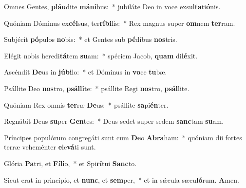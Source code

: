 \item Omnes Gentes, \textbf{pláu}dite \textbf{má}\textbf{ni}bus:~* jubiláte Deo in voce exsul\textbf{ta}ti\textbf{ó}nis.
\item Quóniam Dóminus ex\textbf{cél}sus, ter\textbf{rí}\textbf{bi}lis:~* Rex magnus super \textbf{om}nem \textbf{ter}ram.
\item Subjécit \textbf{pó}pulos \textbf{no}bis:~* et Gentes sub \textbf{pé}dibus \textbf{nos}tris.
\item Elégit nobis heredi\textbf{tá}tem \textbf{su}am:~* spéciem Jacob, \textbf{quam} di\textbf{lé}xit.
\item Ascéndit \textbf{De}us in \textbf{jú}\textbf{bi}lo:~* et Dóminus in \textbf{vo}ce \textbf{tu}bæ.
\item Psállite Deo \textbf{nos}tro, \textbf{psál}\textbf{li}te:~* psállite Regi \textbf{nos}tro, \textbf{psál}lite.
\item Quóniam Rex omnis \textbf{ter}ræ \textbf{De}us:~* psállite \textbf{sa}pi\textbf{én}ter.
\item Regnábit Deus \textbf{su}per \textbf{Gen}tes:~* Deus sedet super sedem \textbf{sanc}tam \textbf{su}am.
\item Príncipes populórum congregáti sunt cum \textbf{De}o \textbf{A}\textbf{bra}ham:~* quóniam dii fortes terræ veheménter \textbf{e}le\textbf{vá}ti sunt.
\item Glória \textbf{Pa}tri, et \textbf{Fí}\textbf{li}o,~* et Spi\textbf{rí}tui \textbf{Sanc}to.
\item Sicut erat in princípio, et \textbf{nunc}, et \textbf{sem}per,~* et in sǽcula sæcu\textbf{ló}rum. \textbf{A}men.
